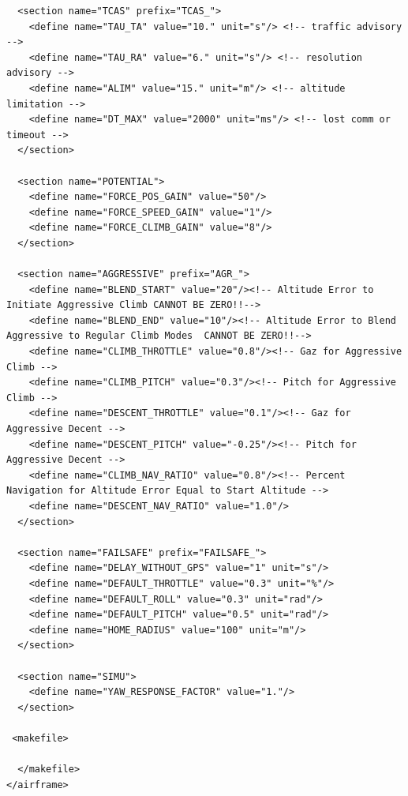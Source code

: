 \documentclass[a4paper,11pt]{report}
\begin{document}
\begin{lstlisting}
  <section name="TCAS" prefix="TCAS_">
    <define name="TAU_TA" value="10." unit="s"/> <!-- traffic advisory -->
    <define name="TAU_RA" value="6." unit="s"/> <!-- resolution advisory -->
    <define name="ALIM" value="15." unit="m"/> <!-- altitude limitation -->
    <define name="DT_MAX" value="2000" unit="ms"/> <!-- lost comm or timeout -->
  </section>

  <section name="POTENTIAL">
    <define name="FORCE_POS_GAIN" value="50"/>
    <define name="FORCE_SPEED_GAIN" value="1"/>
    <define name="FORCE_CLIMB_GAIN" value="8"/>
  </section>

  <section name="AGGRESSIVE" prefix="AGR_">
    <define name="BLEND_START" value="20"/><!-- Altitude Error to Initiate Aggressive Climb CANNOT BE ZERO!!-->
    <define name="BLEND_END" value="10"/><!-- Altitude Error to Blend Aggressive to Regular Climb Modes  CANNOT BE ZERO!!-->
    <define name="CLIMB_THROTTLE" value="0.8"/><!-- Gaz for Aggressive Climb -->
    <define name="CLIMB_PITCH" value="0.3"/><!-- Pitch for Aggressive Climb -->
    <define name="DESCENT_THROTTLE" value="0.1"/><!-- Gaz for Aggressive Decent -->
    <define name="DESCENT_PITCH" value="-0.25"/><!-- Pitch for Aggressive Decent -->
    <define name="CLIMB_NAV_RATIO" value="0.8"/><!-- Percent Navigation for Altitude Error Equal to Start Altitude -->
    <define name="DESCENT_NAV_RATIO" value="1.0"/>
  </section>

  <section name="FAILSAFE" prefix="FAILSAFE_">
    <define name="DELAY_WITHOUT_GPS" value="1" unit="s"/>
    <define name="DEFAULT_THROTTLE" value="0.3" unit="%"/>
    <define name="DEFAULT_ROLL" value="0.3" unit="rad"/>
    <define name="DEFAULT_PITCH" value="0.5" unit="rad"/>
    <define name="HOME_RADIUS" value="100" unit="m"/>
  </section>

  <section name="SIMU">
    <define name="YAW_RESPONSE_FACTOR" value="1."/>
  </section>

 <makefile>

  </makefile>
</airframe>
\end{lstlisting}
\end{document}
